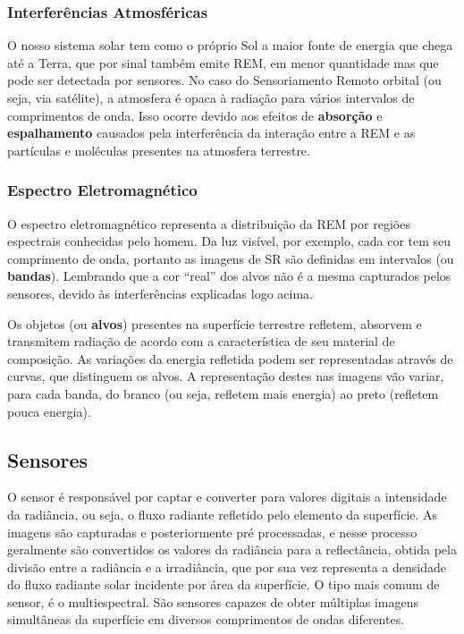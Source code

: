 \subsubsection{Interferências
Atmosféricas}\label{interferencias-atmosfericas}

O nosso sistema solar tem como o próprio Sol a maior fonte de energia
que chega até a Terra, que por sinal também emite \acs{REM}, em menor
quantidade mas que pode ser detectada por sensores. No caso do Sensoriamento Remoto
orbital (ou seja, via satélite), a atmosfera é opaca à radiação para
vários intervalos de comprimentos de onda. Isso ocorre devido aos
efeitos de \textbf{absorção} e \textbf{espalhamento} causados pela
interferência da interação entre a \acs{REM} e as partículas e moléculas
presentes na atmosfera terrestre. \cite{meneses2012introduccao}

\subsubsection{Espectro
Eletromagnético}\label{espectro-eletromagnetico}

O espectro eletromagnético representa a distribuição da \acs{REM} por
regiões espectrais conhecidas pelo homem. Da luz visível, por exemplo,
cada cor tem seu comprimento de onda, portanto as imagens de SR são
definidas em intervalos (ou \textbf{bandas}). Lembrando que a cor
``real'' dos alvos não é a mesma capturados pelos sensores, devido às
interferências explicadas logo acima. \cite{meneses2012introduccao}

Os objetos (ou \textbf{alvos}) presentes na superfície terrestre
refletem, absorvem e transmitem radiação de acordo com a característica
de seu material de composição. As variações da energia refletida podem
ser representadas através de curvas, que distinguem os alvos. A
representação destes nas imagens vão variar, para cada banda, do branco
(ou seja, refletem mais energia) ao preto (refletem pouca energia).

\subsection{Sensores}\label{sensores}

O sensor é responsável por captar e converter para valores digitais a
intensidade da radiância, ou seja, o fluxo radiante refletido pelo
elemento da superfície. As imagens são capturadas e posteriormente pré
processadas, e nesse processo geralmente são convertidos os valores da
radiância para a reflectância, obtida pela divisão entre a radiância e a
irradiância, que por sua vez representa a densidade do fluxo radiante
solar incidente por área da superfície. O tipo mais comum de sensor, é o
multiespectral. São sensores capazes de obter múltiplas imagens
simultâneas da superfície em diversos comprimentos de ondas diferentes. \cite{meneses2012introduccao}


